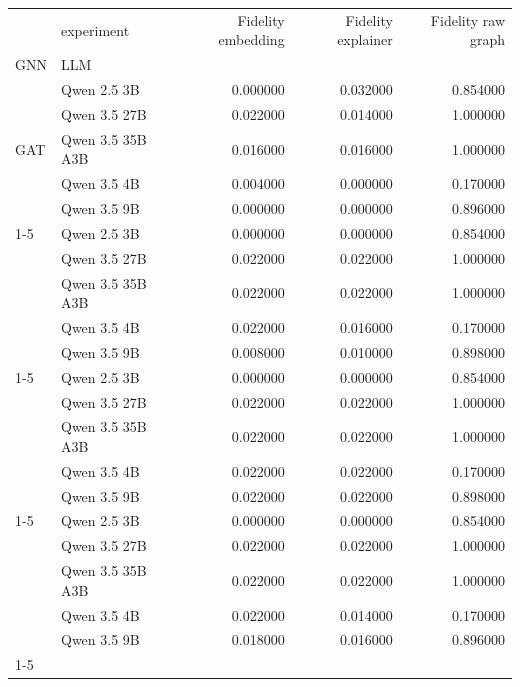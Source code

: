 \begin{tabular}{llrrr}
\toprule
 & experiment & Fidelity embedding & Fidelity explainer & Fidelity raw graph \\
GNN & LLM &  &  &  \\
\midrule
\multirow[t]{5}{*}{GAT} & Qwen 2.5 3B & 0.000000 & 0.032000 & 0.854000 \\
 & Qwen 3.5 27B & 0.022000 & 0.014000 & 1.000000 \\
 & Qwen 3.5 35B A3B & 0.016000 & 0.016000 & 1.000000 \\
 & Qwen 3.5 4B & 0.004000 & 0.000000 & 0.170000 \\
 & Qwen 3.5 9B & 0.000000 & 0.000000 & 0.896000 \\
\cline{1-5}
\multirow[t]{5}{*}{GCN} & Qwen 2.5 3B & 0.000000 & 0.000000 & 0.854000 \\
 & Qwen 3.5 27B & 0.022000 & 0.022000 & 1.000000 \\
 & Qwen 3.5 35B A3B & 0.022000 & 0.022000 & 1.000000 \\
 & Qwen 3.5 4B & 0.022000 & 0.016000 & 0.170000 \\
 & Qwen 3.5 9B & 0.008000 & 0.010000 & 0.898000 \\
\cline{1-5}
\multirow[t]{5}{*}{GIN} & Qwen 2.5 3B & 0.000000 & 0.000000 & 0.854000 \\
 & Qwen 3.5 27B & 0.022000 & 0.022000 & 1.000000 \\
 & Qwen 3.5 35B A3B & 0.022000 & 0.022000 & 1.000000 \\
 & Qwen 3.5 4B & 0.022000 & 0.022000 & 0.170000 \\
 & Qwen 3.5 9B & 0.022000 & 0.022000 & 0.898000 \\
\cline{1-5}
\multirow[t]{5}{*}{GraphSAGE} & Qwen 2.5 3B & 0.000000 & 0.000000 & 0.854000 \\
 & Qwen 3.5 27B & 0.022000 & 0.022000 & 1.000000 \\
 & Qwen 3.5 35B A3B & 0.022000 & 0.022000 & 1.000000 \\
 & Qwen 3.5 4B & 0.022000 & 0.014000 & 0.170000 \\
 & Qwen 3.5 9B & 0.018000 & 0.016000 & 0.896000 \\
\cline{1-5}
\bottomrule
\end{tabular}
